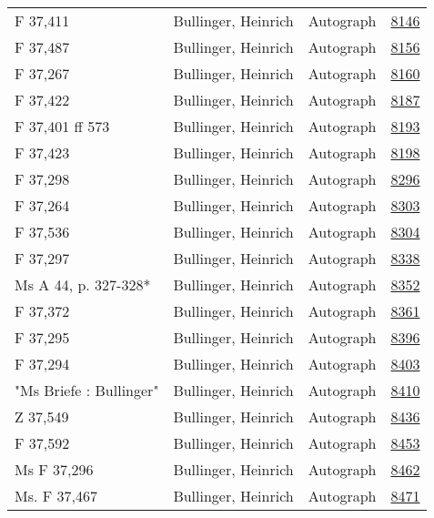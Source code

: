 \documentclass[10pt,a4paper,landscape]{report}
\begin{document}
\begin{longtable}{p{16cm}p{4cm}lr}
F 37,411	&	Bullinger, Heinrich	&	Autograph	&	\href{http://130.60.24.72/assignment/8146}{8146}\\
F 37,487	&	Bullinger, Heinrich	&	Autograph	&	\href{http://130.60.24.72/assignment/8156}{8156}\\
F 37,267	&	Bullinger, Heinrich	&	Autograph	&	\href{http://130.60.24.72/assignment/8160}{8160}\\
F 37,422	&	Bullinger, Heinrich	&	Autograph	&	\href{http://130.60.24.72/assignment/8187}{8187}\\
F 37,401 ff 573	&	Bullinger, Heinrich	&	Autograph	&	\href{http://130.60.24.72/assignment/8193}{8193}\\
F 37,423	&	Bullinger, Heinrich	&	Autograph	&	\href{http://130.60.24.72/assignment/8198}{8198}\\
F 37,298	&	Bullinger, Heinrich	&	Autograph	&	\href{http://130.60.24.72/assignment/8296}{8296}\\
F 37,264	&	Bullinger, Heinrich	&	Autograph	&	\href{http://130.60.24.72/assignment/8303}{8303}\\
F 37,536	&	Bullinger, Heinrich	&	Autograph	&	\href{http://130.60.24.72/assignment/8304}{8304}\\
F 37,297	&	Bullinger, Heinrich	&	Autograph	&	\href{http://130.60.24.72/assignment/8338}{8338}\\
Ms A 44, p. 327-328*	&	Bullinger, Heinrich	&	Autograph	&	\href{http://130.60.24.72/assignment/8352}{8352}\\
F 37,372	&	Bullinger, Heinrich	&	Autograph	&	\href{http://130.60.24.72/assignment/8361}{8361}\\
F 37,295	&	Bullinger, Heinrich	&	Autograph	&	\href{http://130.60.24.72/assignment/8396}{8396}\\
F 37,294	&	Bullinger, Heinrich	&	Autograph	&	\href{http://130.60.24.72/assignment/8403}{8403}\\
"Ms Briefe : Bullinger"	&	Bullinger, Heinrich	&	Autograph	&	\href{http://130.60.24.72/assignment/8410}{8410}\\
Z 37,549	&	Bullinger, Heinrich	&	Autograph	&	\href{http://130.60.24.72/assignment/8436}{8436}\\
F 37,592	&	Bullinger, Heinrich	&	Autograph	&	\href{http://130.60.24.72/assignment/8453}{8453}\\
Ms F 37,296	&	Bullinger, Heinrich	&	Autograph	&	\href{http://130.60.24.72/assignment/8462}{8462}\\
Ms. F 37,467	&	Bullinger, Heinrich	&	Autograph	&	\href{http://130.60.24.72/assignment/8471}{8471}\\

\end{longtable}
\end{document}
